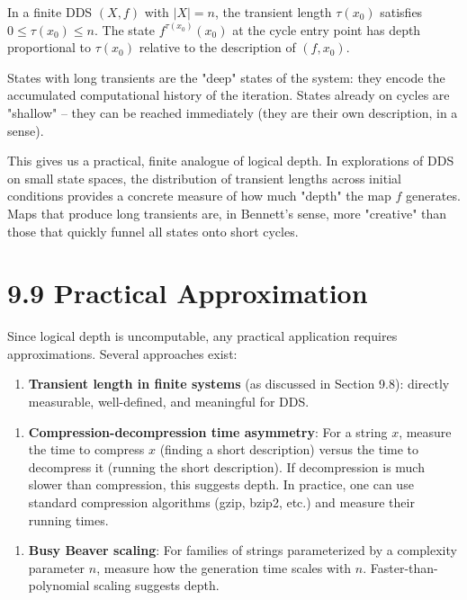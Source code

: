 \begin{proposition}
In a finite DDS $(X, f)$ with $|X| = n$, the transient length $\tau(x_0)$ satisfies $0 \leq \tau(x_0) \leq n$. The state $f^{\tau(x_0)}(x_0)$ at the cycle entry point has depth proportional to $\tau(x_0)$ relative to the description of $(f, x_0)$.

States with long transients are the "deep" states of the system: they encode the accumulated computational history of the iteration. States already on cycles are "shallow" -- they can be reached immediately (they are their own description, in a sense).

This gives us a practical, finite analogue of logical depth. In explorations of DDS on small state spaces, the distribution of transient lengths across initial conditions provides a concrete measure of how much "depth" the map $f$ generates. Maps that produce long transients are, in Bennett's sense, more "creative" than those that quickly funnel all states onto short cycles.
\end{proposition}

\section{9.9 Practical Approximation}

Since logical depth is uncomputable, any practical application requires approximations. Several approaches exist:

\begin{enumerate}
  \item \textbf{Transient length in finite systems} (as discussed in Section 9.8): directly measurable, well-defined, and meaningful for DDS.
\end{enumerate}

\begin{enumerate}
  \item \textbf{Compression-decompression time asymmetry}: For a string $x$, measure the time to compress $x$ (finding a short description) versus the time to decompress it (running the short description). If decompression is much slower than compression, this suggests depth. In practice, one can use standard compression algorithms (gzip, bzip2, etc.) and measure their running times.
\end{enumerate}

\begin{enumerate}
  \item \textbf{Busy Beaver scaling}: For families of strings parameterized by a complexity parameter $n$, measure how the generation time scales with $n$. Faster-than-polynomial scaling suggests depth.
\end{enumerate}

